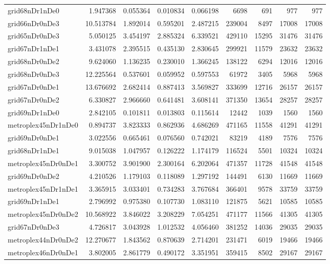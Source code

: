 \documentclass[../../../thesis.tex]{subfiles}
\begin{document}
\begin{longtable}{|l|r|r|r|r|r|r|r|r|}
grid68nDr1nDe0 & 1.947368 & 0.055364 & 0.010834 & 0.066198 & 6698 & 691 & 977 & 977 \\
grid66nDr0nDe3 & 10.513784 & 1.892014 & 0.595201 & 2.487215 & 239004 & 8497 & 17008 & 17008 \\
grid65nDr0nDe3 & 5.050125 & 3.454197 & 2.885324 & 6.339521 & 429110 & 15295 & 31476 & 31476 \\
grid67nDr1nDe1 & 3.431078 & 2.395515 & 0.435130 & 2.830645 & 299921 & 11579 & 23632 & 23632 \\
grid68nDr0nDe2 & 9.624060 & 1.136235 & 0.230010 & 1.366245 & 138122 & 6294 & 12016 & 12016 \\
grid68nDr0nDe3 & 12.225564 & 0.537601 & 0.059952 & 0.597553 & 61972 & 3405 & 5968 & 5968 \\
grid67nDr0nDe1 & 13.676692 & 2.682414 & 0.887413 & 3.569827 & 333699 & 12716 & 26157 & 26157 \\
grid67nDr0nDe2 & 6.330827 & 2.966660 & 0.641481 & 3.608141 & 371350 & 13654 & 28257 & 28257 \\
grid69nDr1nDe0 & 2.842105 & 0.101811 & 0.013803 & 0.115614 & 12442 & 1039 & 1560 & 1560 \\
metroplex45nDr1nDe0 & 0.894737 & 3.823333 & 0.862936 & 4.686269 & 471165 & 11558 & 41291 & 41291 \\
grid69nDr0nDe1 & 3.022556 & 0.665461 & 0.076560 & 0.742021 & 83219 & 4189 & 7576 & 7576 \\
grid68nDr1nDe1 & 9.015038 & 1.047957 & 0.126222 & 1.174179 & 116524 & 5501 & 10324 & 10324 \\
metroplex45nDr0nDe1 & 3.300752 & 3.901900 & 2.300164 & 6.202064 & 471357 & 11728 & 41548 & 41548 \\
grid69nDr0nDe2 & 4.210526 & 1.179103 & 0.118089 & 1.297192 & 144491 & 6130 & 11669 & 11669 \\
metroplex45nDr1nDe1 & 3.365915 & 3.033401 & 0.734283 & 3.767684 & 366401 & 9578 & 33759 & 33759 \\
grid69nDr1nDe1 & 2.796992 & 0.975380 & 0.107730 & 1.083110 & 121875 & 5621 & 10585 & 10585 \\
metroplex45nDr0nDe2 & 10.568922 & 3.846022 & 3.208229 & 7.054251 & 471177 & 11566 & 41305 & 41305 \\
grid67nDr0nDe3 & 4.726817 & 3.043928 & 1.012532 & 4.056460 & 381252 & 14036 & 29035 & 29035 \\
metroplex44nDr0nDe2 & 12.270677 & 1.843562 & 0.870639 & 2.714201 & 231471 & 6019 & 19466 & 19466 \\
metroplex46nDr0nDe1 & 3.802005 & 2.861779 & 0.490172 & 3.351951 & 359415 & 8502 & 29167 & 29167 \\

\end{longtable}
\end{document}
